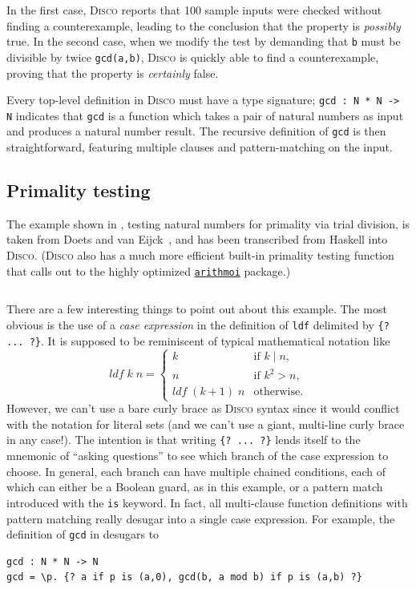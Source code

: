 \documentclass[submission,copyright,creativecommons]{eptcs}
\newcommand{\disco}{\textsc{Disco}\xspace}
\newcommand{\pkg}[1]{\href{https://hackage.haskell.org/package/#1}{\texttt{#1}}}
\newcommand{\pref}[1]{\prettyref{#1}}
\begin{document}
In the first case, \disco reports that 100 sample inputs were checked
without finding a counterexample, leading to the conclusion that the
property is \emph{possibly} true.  In the second case, when we modify
the test by demanding that \verb|b| must be divisible by twice
\verb|gcd(a,b)|, \disco is quickly able to find a counterexample,
proving that the property is \emph{certainly} false.

Every top-level definition in \disco must have a type signature;
\verb|gcd : N * N -> N| indicates that \verb|gcd| is a function which
takes a pair of natural numbers as input and produces a natural number
result.  The recursive definition of \verb|gcd| is then
straightforward, featuring multiple clauses and pattern-matching on
the input.

\subsection{Primality testing}
\label{sec:primetest}

The example shown in \pref{lst:prime}, testing natural numbers for
primality via trial division, is taken from Doets and van
Eijck~\cite[pp. 4--11]{Doets:2004}, and has been transcribed from
Haskell into \disco. (\disco also has a much more efficient built-in
primality testing function that calls out to the highly optimized
\pkg{arithmoi} package.)

\begin{listing}[!htp]
\inputminted{text}{examples/prime.disco}
\caption{Primality testing in \disco}
\label{lst:prime}
\end{listing}

There are a few interesting things to point out about this example.
The most obvious is the use of a \emph{case expression} in the
definition of \verb|ldf| delimited by \verb|{? ... ?}|.  It is
supposed to be reminiscent of typical mathematical notation like
\[ \mathit{ldf}\;k\;n = \begin{cases} k & \text{if } k \mid n, \\ n &
    \text{if } k^2 > n, \\ \mathit{ldf}\;(k+1)\;n &
    \text{otherwise.} \end{cases} \] However, we can't use a bare
curly brace as \disco syntax since it would conflict with the notation
for literal sets (and we can't use a giant, multi-line curly brace in
any case!).  The intention is that writing %
\verb|{? ... ?}| lends itself to the mnemonic of ``asking questions''
to see which branch of the case expression to choose.  In general,
each branch can have multiple chained conditions, each of which can
either be a Boolean guard, as in this example, or a pattern match
introduced with the \verb|is| keyword.  In fact, all multi-clause
function definitions with pattern matching really desugar into a
single case expression. For example, the definition of \verb|gcd| in
\pref{lst:gcd} desugars to
\begin{verbatim}
gcd : N * N -> N
gcd = \p. {? a if p is (a,0), gcd(b, a mod b) if p is (a,b) ?}
\end{verbatim}
\end{document}
